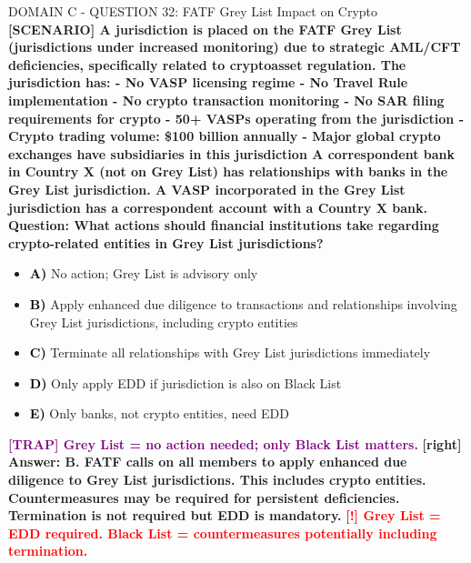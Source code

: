\documentclass[11pt,a4paper]{beamer}
\newcommand{\redflag}[1]{\textcolor{red}{\textbf{[!] #1}}}
\newcommand{\trap}[1]{\textcolor{purple}{\textbf{[TRAP] #1}}}
\newcommand{\correct}[1]{\textcolor{green!50!black}{\textbf{[right] #1}}}
\newcommand{\scenario}[1]{\textcolor{blue!70!black}{\textbf{[SCENARIO] #1}}}
\newcommand{\option}[1]{\textcolor{black}{\textbf{#1}}}
\begin{document}
\begin{frame}{DOMAIN C - QUESTION 32: FATF Grey List Impact on Crypto}
\scenario{A jurisdiction is placed on the FATF Grey List (jurisdictions under increased monitoring) due to strategic AML/CFT deficiencies, specifically related to cryptoasset regulation. The jurisdiction has:
- No VASP licensing regime
- No Travel Rule implementation
- No crypto transaction monitoring
- No SAR filing requirements for crypto
- 50+ VASPs operating from the jurisdiction
- Crypto trading volume: \$100 billion annually
- Major global crypto exchanges have subsidiaries in this jurisdiction
A correspondent bank in Country X (not on Grey List) has relationships with banks in the Grey List jurisdiction. A VASP incorporated in the Grey List jurisdiction has a correspondent account with a Country X bank.}
\vspace{0.2cm}
\textbf{Question: What actions should financial institutions take regarding crypto-related entities in Grey List jurisdictions?}
\vspace{0.1cm}
\begin{itemize}
    \item \option{A)} No action; Grey List is advisory only
    \item \option{B)} Apply enhanced due diligence to transactions and relationships involving Grey List jurisdictions, including crypto entities
    \item \option{C)} Terminate all relationships with Grey List jurisdictions immediately
    \item \option{D)} Only apply EDD if jurisdiction is also on Black List
    \item \option{E)} Only banks, not crypto entities, need EDD
\end{itemize}
\vspace{0.2cm}
\trap{Grey List = no action needed; only Black List matters.}
\correct{Answer: B. FATF calls on all members to apply enhanced due diligence to Grey List jurisdictions. This includes crypto entities. Countermeasures may be required for persistent deficiencies. Termination is not required but EDD is mandatory.}
\redflag{Grey List = EDD required. Black List = countermeasures potentially including termination.}
\end{frame}
\end{document}
